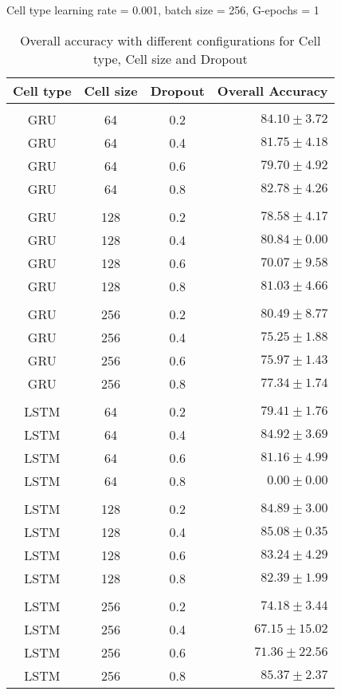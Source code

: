\begin{paragraph}{Cell type}
learning rate = 0.001, batch size = 256, G-epochs = 1

\begin{table}[!htbp]
  \centering
  \begin{tabular}{cccr} 
      Cell type & Cell size & Dropout & Overall Accuracy\\[0.2cm] 
      \hline \\[-0.2cm] 
      GRU   &   64  & 0.2 &  $84.10 \pm 3.72$\\
      GRU   &   64  & 0.4 &  $81.75 \pm 4.18$\\
      GRU   &   64  & 0.6 &  $79.70 \pm 4.92$\\
      GRU   &   64  & 0.8 &  $82.78 \pm 4.26$\\[0.05cm] \hline \\[-0.25cm]
      GRU   &   128 & 0.2 &  $78.58 \pm 4.17$\\
      GRU   &   128 & 0.4 &  $80.84 \pm 0.00$\\
      GRU   &   128 & 0.6 &  $70.07 \pm 9.58$\\
      GRU   &   128 & 0.8 &  $81.03 \pm 4.66$\\[0.05cm] \hline \\[-0.25cm]
      GRU   &   256 & 0.2 &  $80.49 \pm 8.77$\\
      GRU   &   256 & 0.4 &  $75.25 \pm 1.88$\\
      GRU   &   256 & 0.6 &  $75.97 \pm 1.43$\\
      GRU   &   256 & 0.8 &  $77.34 \pm 1.74$\\[0.05cm] \hline \\[-0.25cm]
      LSTM  &   64  & 0.2 &  $79.41 \pm 1.76$\\
      LSTM  &   64  & 0.4 &  $84.92 \pm 3.69$\\
      LSTM  &   64  & 0.6 &  $81.16 \pm 4.99$\\
      LSTM  &   64  & 0.8 &  $0.00 \pm 0.00$\\[0.05cm] \hline \\[-0.25cm]
      LSTM  &   128 & 0.2 &  $84.89 \pm 3.00$\\
      LSTM  &   128 & 0.4 &  $85.08 \pm 0.35$\\
      LSTM  &   128 & 0.6 &  $83.24 \pm 4.29$\\
      LSTM  &   128 & 0.8 &  $82.39 \pm 1.99$\\[0.05cm] \hline \\[-0.25cm]
      LSTM  &   256 & 0.2 &  $74.18 \pm 3.44$\\
      LSTM  &   256 & 0.4 &  $67.15 \pm 15.02$\\
      LSTM  &   256 & 0.6 &  $71.36 \pm 22.56$\\
      LSTM  &   256 & 0.8 &  $85.37 \pm 2.37$\\ 
      
  \end{tabular}
  \caption{Overall accuracy with different configurations for Cell type, Cell size and Dropout}
  \label{tab:AJRNNCellTypeResults}
\end{table}

\end{paragraph}


